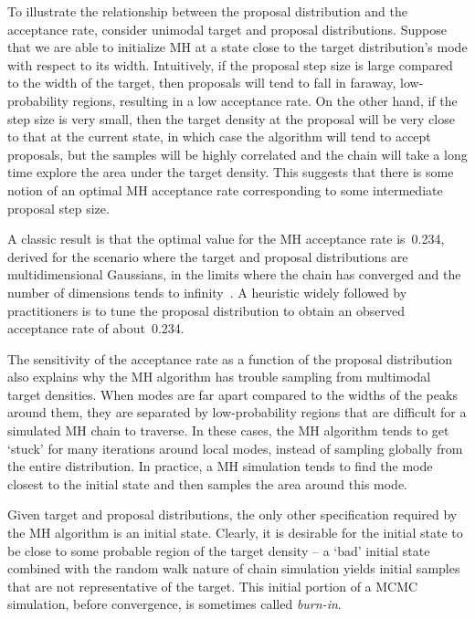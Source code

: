\documentclass[angelino.tex]{subfiles}
\begin{document}
To illustrate the relationship between the proposal distribution and the
acceptance rate, consider unimodal target and proposal distributions.
Suppose that we are able to initialize MH at a state
close to the target distribution's mode with respect to its width.
Intuitively, if the proposal step size is large compared to the width of the
target, then proposals will tend to fall in faraway, low-probability regions,
resulting in a low acceptance rate.
On the other hand, if the step size is very small, then the target density
at the proposal will be very close to that at the current state,
in which case the algorithm will tend to accept proposals,
but the samples will be highly correlated and the chain will take a long time
explore the area under the target density.
This suggests that there is some notion of an optimal MH acceptance rate
corresponding to some intermediate proposal step size.

A classic result is that the optimal value for the MH acceptance rate is~0.234, 
derived for the scenario where the target and proposal distributions are 
multidimensional Gaussians, in the limits where the chain has converged and
the number of dimensions tends to infinity~\citep{roberts-1997-accept}.
A heuristic widely followed by practitioners is to tune the proposal
distribution to obtain an observed acceptance rate of about~0.234.

The sensitivity of the acceptance rate as a function of
the proposal distribution also explains why the MH algorithm
has trouble sampling from multimodal target densities.
When modes are far apart compared to the widths of the peaks around them,
they are separated by low-probability regions that are difficult for a
simulated MH chain to traverse.
In these cases, the MH algorithm tends to get `stuck' for many iterations
around local modes, instead of sampling globally from the entire distribution.
In practice, a MH simulation tends to find the mode closest to the initial state
and then samples the area around this mode.

Given target and proposal distributions, the only other specification required
by the MH algorithm is an initial state.
Clearly, it is desirable for the initial state to be close to some probable
region of the target density -- 
a `bad' initial state combined with the random walk nature of chain simulation
yields initial samples that are not representative of the target.
This initial portion of a MCMC simulation, before convergence,
is sometimes called \emph{burn-in}.
\end{document}
